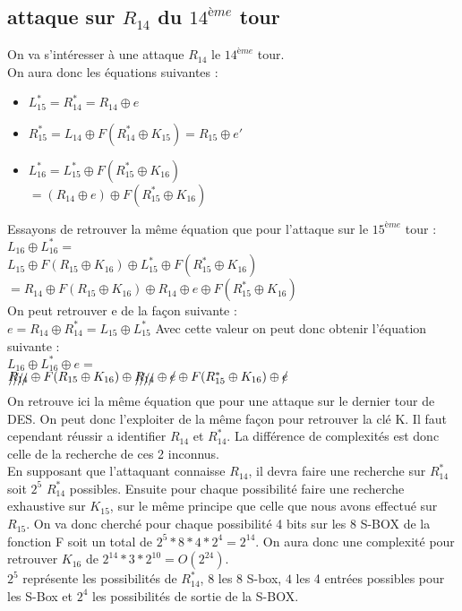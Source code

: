 \documentclass[a4paper,11pt]{article}
\begin{document}
	\subsection{attaque sur $R_{14}$ du $14^{ème}$ tour}
	On va s'intéresser à une attaque $R_{14}$ le $14^{ème}$ tour.\\
	On aura donc les équations suivantes :
	\begin{itemize}
		\item $L_{15}^{*} = R_{14}^{*} = R_{14} \oplus e$
		\item $R_{15}^{*} = L_{14}\oplus F( R_{14}^{*}\oplus K_{15}) = R_{15} \oplus e'$
		\item $L_{16}^{*} = L_{15}^{*}\oplus F( R_{15}^{*}\oplus K_{16})$\\
		$= (R_{14} \oplus e)\oplus  F( R_{15}^{*}\oplus K_{16})$
	\end{itemize}
	Essayons de retrouver la même équation que pour l'attaque sur le $15^{ème}$ tour :\\
	$L_{16} \oplus L_{16}^{*} = $\\ 
	$L_{15}\oplus  F( R_{15}\oplus K_{16})\oplus L_{15}^{*} \oplus F( R_{15}^{*}\oplus K_{16})$\\
	$= R_{14}\oplus  F( R_{15}\oplus K_{16})\oplus  R_{14} \oplus e \oplus F( R_{15}^{*}\oplus K_{16})$\\
	On peut retrouver e de la façon suivante :\\
	$e = R_{14}\oplus R_{14}^{*} = L_{15}\oplus  L_{15}^{*}$
	Avec cette valeur on peut donc obtenir l'équation suivante :\\
	$L_{16} \oplus L_{16}^{*} \oplus e = $\\ 
	$\xout{R_{14}}\oplus  F( R_{15}\oplus K_{16})\oplus  \xout{R_{14}} \oplus \xout{e} \oplus F( R_{15}^{*}\oplus K_{16})\oplus \xout{e}$\\
	On retrouve ici la même équation que pour une attaque sur le dernier tour de DES. On peut donc l'exploiter de la même façon pour retrouver la clé K. Il faut cependant réussir a identifier $R_{14}$ et $R_{14}^{*}$. La différence de complexités est donc celle de la recherche de ces 2 inconnus.\\
	En supposant que l'attaquant connaisse $R_{14}$, il devra faire une recherche sur $R_{14}^{*}$ soit $2^{5}$  $R_{14}^{*}$ possibles. Ensuite pour chaque possibilité faire une recherche exhaustive sur $K_{15}$, sur le même principe que celle que nous avons effectué sur $R_{15}$. On va donc cherché pour chaque possibilité 4 bits sur les 8 S-BOX de la fonction F soit un total de $2^{5}*8*4*2^{4} = 2^{14}$. On aura donc une complexité pour retrouver $K_{16}$ de $2^{14} * 3 * 2^{10} = O(2^{24})$.\\
	\small $2^{5}$ représente les possibilités de  $R_{14}^{*}$, $8$ les 8 S-box, $4$ les 4 entrées possibles pour les S-Box et $2^{4}$ les possibilités de sortie de la S-BOX.
\end{document}
